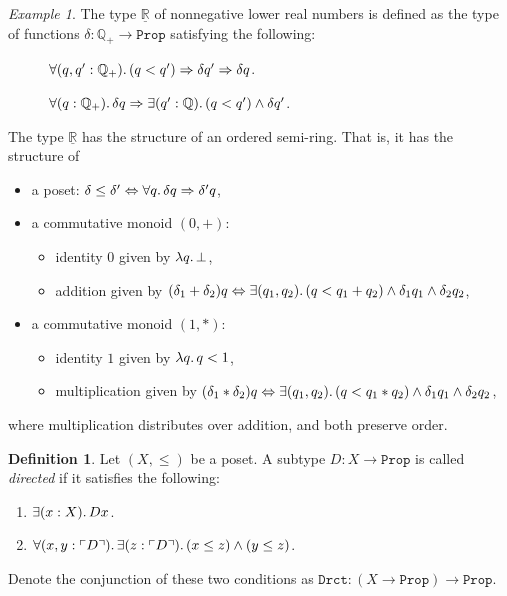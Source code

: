 \documentclass[11pt, oneside, article]{memoir}
\theoremstyle{plain}
\theoremstyle{definition}
\newtheorem{definition}[theorem]{Definition}
\theoremstyle{remark}
\newtheorem{example}[theorem]{Example}
\DeclarePairedDelimiter{\subtype}{\ulcorner}{\urcorner}
\newcommand{\const}[1]{\mathtt{#1}}
\newcommand{\ul}[1]{\underline{#1}}
\newcommand{\QQ}{\mathbb{Q}}
\newcommand{\QQp}{\QQ_{+}}
\newcommand{\LR}{\ul{\mathbb{R}}}
\newcommand{\Prop}{\const{Prop}}
\newcommand{\imp}{\Rightarrow}
\renewcommand{\iff}{\Leftrightarrow}
\begin{document}
\begin{example}
The type $\LR$ of nonnegative lower real numbers is defined as the type of functions $\delta:\QQp\to\Prop$ satisfying the following:
\begin{description}
	\item[\quad\parbox{1in}{Down-closed:}] $\forall(q,q':\QQp)\ldotp (q<q')\imp\delta q'\imp\delta q$.
	\item[\quad\parbox{1in}{Rounded:}] $\forall(q:\QQp)\ldotp\delta q\imp\exists(q':\QQ)\ldotp(q<q')\wedge\delta q'$.
\end{description}
The type $\LR$ has the structure of an ordered semi-ring. That is, it has the structure of
\begin{itemize}
	\item a poset: $\delta\leq \delta'\iff\forall q\ldotp\delta q\imp\delta'q$,
	\item a commutative monoid $(0,+)$:
	\begin{itemize}
		\item identity $0$ given by $\lambda q\ldotp \bot$,
		\item  addition given by $(\delta_1+\delta_2)q\iff\exists(q_1,q_2)\ldotp(q<q_1+q_2)\wedge\delta_1q_1\wedge\delta_2q_2$,
	\end{itemize}
	\item a commutative monoid $(1,*)$:
	\begin{itemize}
		\item identity $1$ given by $\lambda q\ldotp q<1$,
		\item multiplication given by $(\delta_1*\delta_2)q\iff\exists(q_1,q_2)\ldotp(q<q_1*q_2)\wedge\delta_1q_1\wedge\delta_2q_2$,
	\end{itemize}
\end{itemize}
where multiplication distributes over addition, and both preserve order.
\end{example}

\begin{definition}
Let $(X,\leq)$ be a poset. A subtype $D:X\to\Prop$ is called \emph{directed} if it satisfies the following:
\begin{enumerate}
	\item $\exists(x:X)\ldotp Dx$.
	\item $\forall(x,y:\subtype{D})\ldotp\exists(z:\subtype{D})\ldotp(x\leq z)\wedge (y\leq z)$.
\end{enumerate}
Denote the conjunction of these two conditions as $\const{Drct}:(X\to\Prop)\to\Prop$.
\end{definition}
\end{document}
